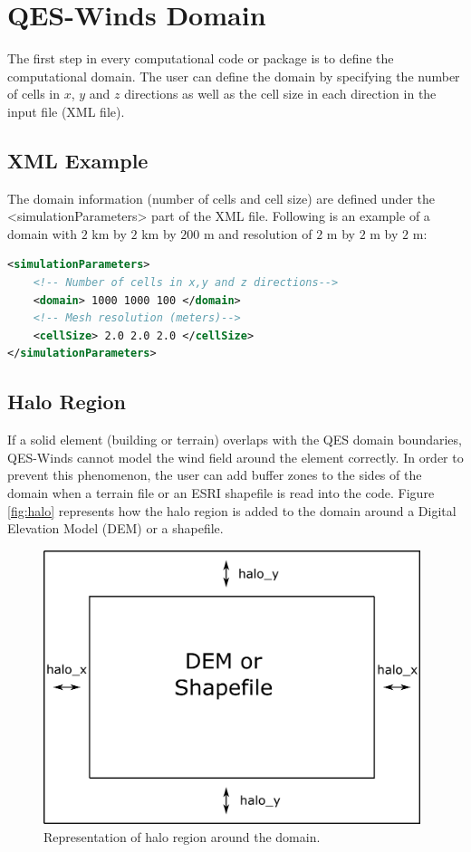 \section{QES-Winds Domain}

The first step in every computational code or package is to define the computational domain. The user can define the domain by specifying the number of cells in $x$, $y$ and $z$ directions as well as the cell size in each direction in the input file (XML file).

\subsection{XML Example}

The domain information (number of cells and cell size) are defined under the <simulationParameters> part of the XML file. Following is an example of a domain with $2$ km by $2$ km by $200$ m and resolution of $2$ m by $2$ m by $2$ m:

\begin{lstlisting}[language=XML]
<simulationParameters>
	<!-- Number of cells in x,y and z directions-->
  	<domain> 1000 1000 100 </domain>	
  	<!-- Mesh resolution (meters)-->				
  	<cellSize> 2.0 2.0 2.0 </cellSize> 				
</simulationParameters>
\end{lstlisting}

\subsection{Halo Region}

If a solid element (building or terrain) overlaps with the QES domain boundaries, QES-Winds cannot model the wind field around the element correctly. In order to prevent this phenomenon, the user can add buffer zones to the sides of the domain when a terrain file or an ESRI shapefile is read into the code. Figure \ref{fig:halo} represents how the halo region is added to the domain around a Digital Elevation Model (DEM) or a shapefile.

\begin{figure}[h!]
\centering
\includegraphics[width=11.0cm,keepaspectratio]{Images/domain_halo.png}
\caption{Representation of halo region around the domain.}
\end{figure}

